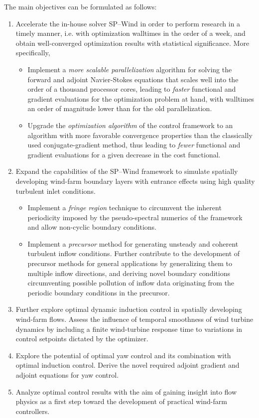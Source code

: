 The main objectives can be formulated as follows: 
\begin{enumerate}
	\item Accelerate the in-house solver SP--Wind in order to perform research in a timely manner, i.e. with optimization walltimes in the order of a week, and obtain well-converged optimization results with statistical significance. More specifically, 
		\begin{itemize}
			\item Implement a  \emph{more scalable parallelization} algorithm for solving the forward and adjoint Navier-Stokes equations that scales well into the order of a thousand processor cores, leading to \emph{faster} functional and gradient evaluations for the optimization problem at hand, with walltimes an order of magnitude lower than for the old parallelization.
			\item Upgrade the \emph{optimization algorithm} of the control framework to an algorithm with more favorable convergence properties than the classically used conjugate-gradient method, thus leading to \emph{fewer} functional and gradient evaluations for a given decrease in the cost functional.
		\end{itemize}
	\item Expand the capabilities of the SP--Wind framework to simulate spatially developing wind-farm boundary layers with entrance effects using high quality turbulent inlet conditions.  
		\begin{itemize}
			\item Implement a \emph{fringe region} technique to circumvent the inherent periodicity imposed by the pseudo-spectral numerics of the framework and allow non-cyclic boundary conditions. 
			\item Implement a \emph{precursor} method for generating unsteady and coherent turbulent inflow conditions. Further contribute to the development of precursor methods for general applications by generalizing them to multiple inflow directions, and deriving novel boundary conditions circumventing possible pollution of inflow data originating from the periodic boundary conditions in the precursor.
		\end{itemize}
	\item Further explore optimal dynamic induction control in spatially developing wind-farm flows. Assess the influence of temporal smoothness of wind turbine dynamics by including a finite wind-turbine response time to variations in control setpoints dictated by the optimizer. 
	\item Explore the potential of optimal yaw control and its combination with optimal induction control. Derive the novel required adjoint gradient and adjoint equations for yaw control.
	\item Analyze optimal control results with the aim of gaining insight into flow physics as a first step toward the development of practical wind-farm controllers.
\end{enumerate}

